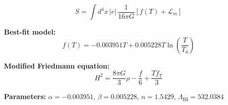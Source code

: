 
\begin{equation}
  S = \int d^4x \, |e| \, \frac{1}{16\pi G} \left[ f(T) + \mathcal{L}_m \right]
\end{equation}

\textbf{Best-fit model:}
\begin{equation}
  f(T) = -0.003951 T + 0.005228 T \ln\!\left(\frac{T}{T_0}\right)
\end{equation}

\textbf{Modified Friedmann equation:}
\begin{equation}
  H^2 = \frac{8\pi G}{3} \rho - \frac{f}{6} + \frac{T f_T}{3}
\end{equation}

\textbf{Parameters:}
$\alpha = -0.003951$, \quad
$\beta = 0.005228$, \quad
$n = 1.5429$, \quad
$\Lambda_{\text{BI}} = 532.0384$